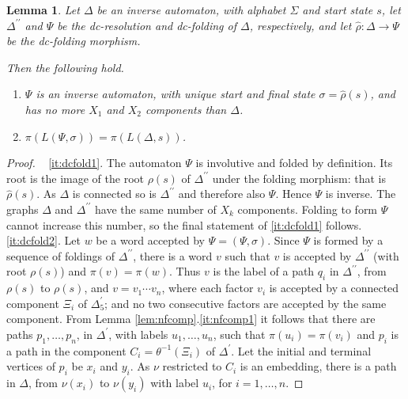 \documentclass[a4paper,12pt]{article}
\newcommand{\D}{\Delta }
\newcommand{\s}{\sigma }
\renewcommand{\S}{\Sigma }
\newtheorem{lemma}[theorem]{Lemma}
\numberwithin{equation}{section}
\numberwithin{figure}{section}
\newcommand{\maps}{\rightarrow}
\newcommand{\be}{\begin{enumerate}}
\newcommand{\ee}{\end{enumerate}}
\begin{document}
\begin{lemma}\label{lem:dcfold}
Let $\D$ be  an inverse automaton, with alphabet $\S$ and start
state $s$, let $\D^{\prime\prime}$  and $\Psi$ be the
dc-resolution and dc-folding of $\D$, respectively, and
let $\hat\rho:\D\maps \Psi$ be the dc-folding morphism.

 Then the following hold.
\be
\item
\label{it:dcfold1} $\Psi$ is an inverse automaton, with unique
start and  final state $\s=\hat\rho(s)$, and has no more $X_1$ and
$X_2$ components than $\D$.
\item \label{it:dcfold2}
$\pi(L(\Psi,\s))=\pi(L(\D,s))$.
\ee
\end{lemma}
\begin{proof} ~
\ref{it:dcfold1}.
The automaton $\Psi$ is involutive and folded by definition.
 Its root is the image of the root $\rho(s)$ of $\D^{\prime\prime}$ under
 the folding morphism: that is $\hat\rho(s)$.
 As
$\D$ is connected  so is $\D^{\prime\prime}$ and therefore also
$\Psi$. Hence $\Psi$ is inverse. The graphs $\D$ and
$\D^{\prime\prime}$  have the same number of $X_k$ components.
Folding to form $\Psi$ cannot increase this number, so the final
statement of \ref{it:dcfold1} follows.
 \\[1em]
\ref{it:dcfold2}. Let $w$ be a word accepted by $\Psi=(\Psi,\s)$. Since
$\Psi$ is formed by a sequence of foldings of $\D^{\prime\prime}$,
there is a word $v$ such that $v$ is accepted by
$\D^{\prime\prime}$ (with root $\rho(s)$) and $\pi(v)=\pi(w)$.
Thus $v$ is the label of a path $q_i$ in $\D^{\prime\prime}$, from  $\rho(s)$
to $\rho(s)$, and
 $v=v_1\cdots v_n$,
where each factor $v_i$ is accepted by a connected component $\Xi_i$ of
$\D^\prime_5$;  and no two consecutive factors are accepted by the
same component. From Lemma \ref{lem:nfcomp}.\ref{it:nfcomp1} it
follows that there are paths $p_1,\ldots, p_n$, in $\D^\prime$,
with labels
 $u_1,\ldots , u_n$, such that
$\pi(u_i)=\pi(v_i)$ and
$p_i$ is a path in the component
$C_i=\theta^{-1}(\Xi_i)$ of $\D^\prime$.
Let the initial and terminal vertices of $p_i$ be $x_i$ and  $y_i$.
As $\nu$ restricted to $C_i$ is an embedding, there is a path in $\D$,  from
$\nu(x_i)$ to $\nu(y_i)$ with label $u_i$, for $i=1,\ldots, n$.


\end{proof}
\end{document}
